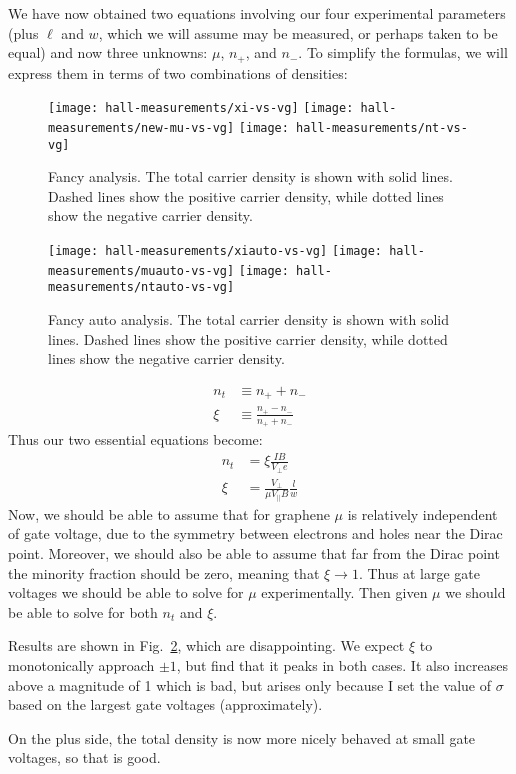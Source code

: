 \documentclass[twocolumn]{revtex4-1}
\begin{document}
We have now obtained two equations involving our four experimental
parameters (plus $\ell$ and $w$, which we will assume may be measured,
or perhaps taken to be equal) and now three unknowns:  $\mu$, $n_+$,
and $n_-$.  To simplify the formulas, we will express them in terms of
two combinations of densities:
\begin{figure}
  \texttt{[image: hall-measurements/xi-vs-vg]}
  \texttt{[image: hall-measurements/new-mu-vs-vg]}
  \texttt{[image: hall-measurements/nt-vs-vg]}
  \caption{Fancy analysis.  The total carrier density is shown with
    solid lines.  Dashed lines show the positive carrier density,
    while dotted lines show the negative carrier density.}
  \label{fig:nice}
\end{figure}
\begin{figure}
  \texttt{[image: hall-measurements/xiauto-vs-vg]}
  \texttt{[image: hall-measurements/muauto-vs-vg]}
  \texttt{[image: hall-measurements/ntauto-vs-vg]}
  \caption{Fancy auto analysis.  The total carrier density is shown with
    solid lines.  Dashed lines show the positive carrier density,
    while dotted lines show the negative carrier density.}
  \label{fig:nice}
\end{figure}
\begin{align}
  n_t &\equiv n_+ + n_- \\
  \xi &\equiv \frac{n_+ - n_-}{n_+ + n_-}
\end{align}
Thus our two essential equations become:
\begin{align}
  n_t &= \xi\frac{IB}{V_\perp e} \\
  \xi  &= \frac{V_\perp}{\mu V_\parallel B}\frac{l}{w}
\end{align}
Now, we should be able to assume that for graphene $\mu$ is
relatively independent of gate voltage, due to the symmetry between
electrons and holes near the Dirac point.  Moreover, we should also be
able to assume that far from the Dirac point the minority fraction
should be zero, meaning that $\xi \rightarrow 1$.  Thus at large gate
voltages we should be able to solve for $\mu$ experimentally.  Then
given $\mu$ we should be able to solve for both $n_t$ and $\xi$.

Results are shown in Fig.~\ref{fig:nice}, which are disappointing.  We
expect $\xi$ to monotonically approach $\pm 1$, but find that it peaks
in both cases.  It also increases above a magnitude of 1 which is bad,
but arises only because I set the value of $\sigma$ based on the
largest gate voltages (approximately).

On the plus side, the total density is now more nicely behaved at
small gate voltages, so that is good.
\end{document}

